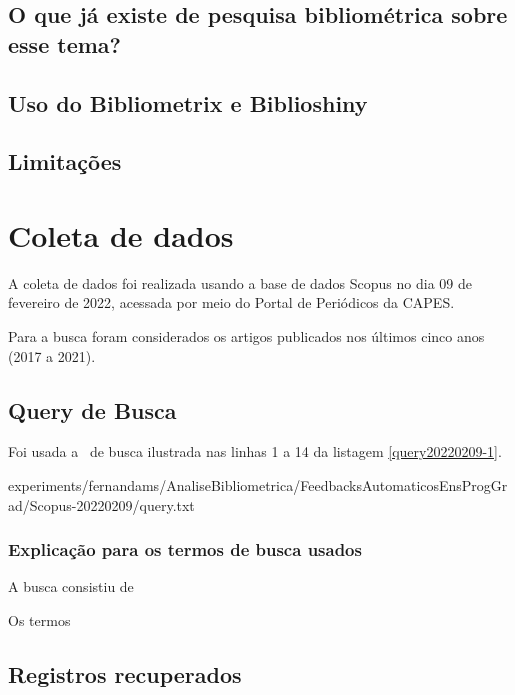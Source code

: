\subsection{O que já existe de pesquisa bibliométrica sobre esse tema?}

\subsection{Uso do Bibliometrix e Biblioshiny}

\subsection{Limitações}

\section{Coleta de dados \label{FeedAuto:coleta}}

A coleta de dados foi realizada usando a base de dados Scopus no dia 09 de fevereiro de 2022, acessada por meio do Portal de Periódicos da CAPES.

Para a busca foram considerados os artigos publicados nos últimos cinco anos (2017 a 2021).

\subsection{Query de Busca}

Foi usada a \query\  de busca ilustrada nas linhas 1 a 14 da listagem \ref{query20220209-1}.


{experiments/fernandams/AnaliseBibliometrica/FeedbacksAutomaticosEnsProgGrad/Scopus-20220209/query.txt}

\subsubsection{Explicação para os termos de busca usados\label{FeedAuto:query}}

A busca consistiu de 

Os termos

\subsection{Registros recuperados}

